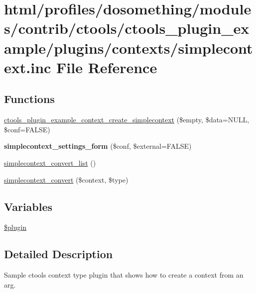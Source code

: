 \hypertarget{simplecontext_8inc}{
\section{html/profiles/dosomething/modules/contrib/ctools/ctools\_\-plugin\_\-example/plugins/contexts/simplecontext.inc File Reference}
\label{simplecontext_8inc}
}
\subsection*{Functions}
\begin{DoxyCompactItemize}
\item 
\hyperlink{simplecontext_8inc_a557e40ddcf639b68c1ef2b299ab7a4f9}{ctools\_\-plugin\_\-example\_\-context\_\-create\_\-simplecontext} (\$empty, \$data=NULL, \$conf=FALSE)
\item 
\hypertarget{simplecontext_8inc_a588521a6d6165fbf720e34e9b839bb99}{
{\bfseries simplecontext\_\-settings\_\-form} (\$conf, \$external=FALSE)}
\label{simplecontext_8inc_a588521a6d6165fbf720e34e9b839bb99}

\item 
\hyperlink{simplecontext_8inc_a8bb1d1c4c119191be2e1de68a2c29842}{simplecontext\_\-convert\_\-list} ()
\item 
\hyperlink{simplecontext_8inc_a3bdaeace35f32bee225e1267fd4c07cd}{simplecontext\_\-convert} (\$context, \$type)
\end{DoxyCompactItemize}
\subsection*{Variables}
\begin{DoxyCompactItemize}
\item 
\hyperlink{simplecontext_8inc_ada8a7130088351710bb02ed622d6bf65}{\$plugin}
\end{DoxyCompactItemize}


\subsection{Detailed Description}
Sample ctools context type plugin that shows how to create a context from an arg. 

